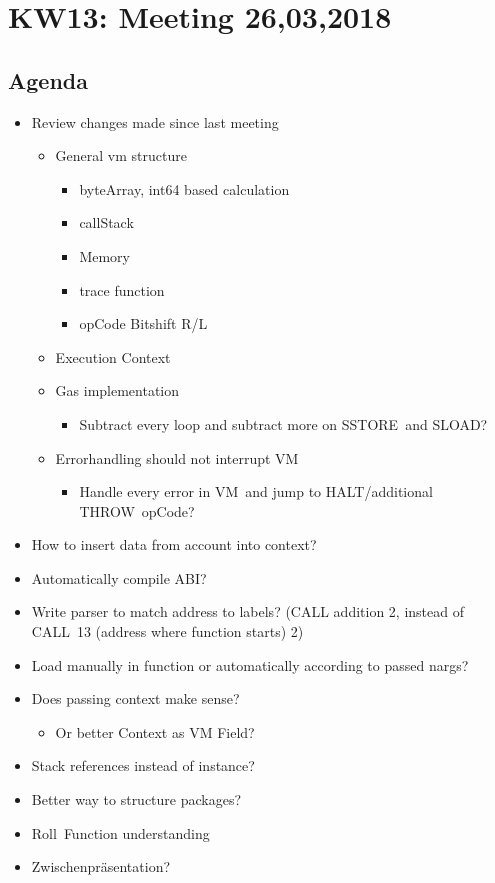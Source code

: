\section{KW13: Meeting 26,03,2018}

\subsection{Agenda}

\begin{itemize}
\item
  Review changes made since last meeting

  \begin{itemize}
  \item
    General vm structure

    \begin{itemize}
    \item
      byteArray, int64 based calculation
    \item
      callStack
    \item
      Memory
    \item
      trace function
    \item
      opCode Bitshift R/L
    \end{itemize}
  \item
    Execution Context
  \item
    Gas implementation

    \begin{itemize}
    \item
      Subtract every loop and subtract more on SSTORE~and SLOAD?
    \end{itemize}
  \item
    Errorhandling should not interrupt VM

    \begin{itemize}
    \item
      Handle every error in VM~and jump to HALT/additional THROW~opCode?
    \end{itemize}
  \end{itemize}
\item
  How to insert data from account into context?
\item
  Automatically compile ABI?
\item
  Write parser to match address to labels? (CALL addition 2, instead of
  CALL~13 (address where function starts) 2)
\item
  Load manually in function or automatically according to passed nargs?
\item
  Does passing context make sense?

  \begin{itemize}
  \item
    Or better Context as VM Field?
  \end{itemize}
\item
  Stack references instead of instance?
\item
  Better way to structure packages?
\item
  Roll~Function understanding
\item
  Zwischenpräsentation?
\end{itemize}

